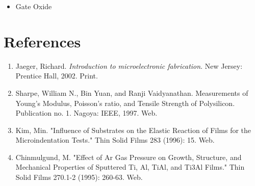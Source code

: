 \documentclass{article}
\begin{document}
\begin{itemize}
\item Gate Oxide
\end{itemize}



\section{References}
\begin{enumerate}
\item Jaeger, Richard. \textit{Introduction to microelectronic fabrication}. New Jersey: Prentice Hall, 2002. Print.
\item Sharpe, William N., Bin Yuan, and Ranji Vaidyanathan. Measurements of Young's Modulus, Poisson's ratio, and Tensile Strength of Polysilicon. Publication no. 1. Nagoya: IEEE, 1997. Web.
\item Kim, Min. "Influence of Substrates on the Elastic Reaction of Films for the Microindentation Tests." Thin Solid Films 283 (1996): 15. Web.
\item Chinmulgund, M. "Effect of Ar Gas Pressure on Growth, Structure, and Mechanical Properties of Sputtered Ti, Al, TiAl, and Ti3Al Films." Thin Solid Films 270.1-2 (1995): 260-63. Web.
\end{enumerate}








\end{document}
